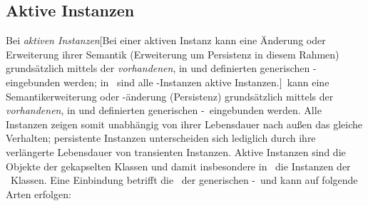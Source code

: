 \subsection{Aktive Instanzen}
%
Bei {\em aktiven Instanzen}[{Bei einer
aktiven Instanz kann eine \"{A}nderung oder Erweiterung ihrer Semantik
(Erweiterung um Persistenz in diesem Rahmen) grund\-s\"{a}tz\-lich
mittels der {\protect\em vorhandenen\/}, in \protect\cite{bib:st90}
und \protect\cite{bib:amop91} definierten generischen
{\protect\std-\protect\fn[en]} eingebunden werden; in
\protect\cl\ sind alle \protect\clos-Instanzen aktive
Instanzen.}]\ kann eine Semantikerweiterung oder -\"{a}nderung
(Persistenz) grund\-s\"{a}tz\-lich mittels der {\em vorhandenen\/}, in
\cite{bib:st90} und \cite{bib:amop91} definierten generischen
\std-\fn[en]\ eingebunden
werden. Alle Instanzen zeigen somit unabh\"{a}ngig von ihrer Lebensdauer
nach au\ss{}en das gleiche Verhalten; persistente Instanzen unterscheiden
sich lediglich durch ihre verl\"{a}ngerte Lebensdauer von transienten
Instanzen. Aktive Instanzen sind die Objekte der gekapselten Klassen
und damit insbesondere in
\cl\ die Instanzen der \clos\ Klassen. Eine Einbindung betrifft die
\mtd[n]\ der generischen \std-\fn[en]\ und kann auf folgende
Arten erfolgen:
%
